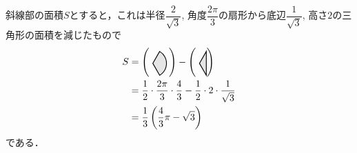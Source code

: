 \documentclass[../../main.tex]{subfiles}
\begin{document}
斜線部の面積$S$とすると，これは半径$\dfrac{2}{\sqrt{3}}$, 角度$\dfrac{2\pi}{3}$の扇形から底辺$\dfrac{1}{\sqrt{3}}$, 高さ$2$の三角形の面積を減じたもので
\begin{align}
  \begin{split}
    S
    &=\left( \text{
        \begin{tikzpicture}[baseline={(0,-0.05)}, scale=0.5, >=stealth]
          \draw[thick, fill=gray!20] (0,0) -- (-60:1) arc (-60:60:1) -- cycle;
    \end{tikzpicture}} \right)
    -
    \left( \text{
        \begin{tikzpicture}[baseline={(0,-0.05)}, scale=0.5, >=stealth]
          \draw[thick, fill=gray!20] (0,0) -- (-60:1) -- (60:1) -- cycle;
    \end{tikzpicture}} \right) \\
    &=\dfrac{1}{2}\cdot\dfrac{2\pi}{3}\cdot\dfrac{4}{3}-\dfrac{1}{2}\cdot 2 \cdot \dfrac{1}{\sqrt{3}} \\
    &=\dfrac{1}{3}\left(\dfrac{4}{3}\pi-\sqrt{3}\right)
  \end{split}
\end{align}
である．
\end{document}
